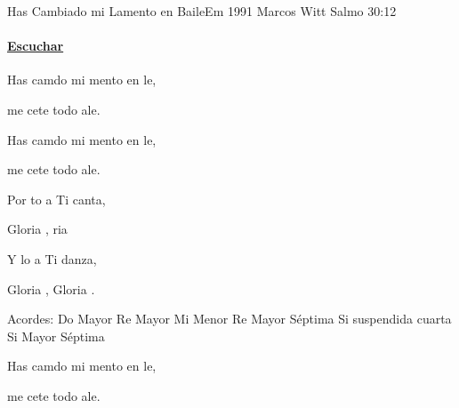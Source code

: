 \documentclass[12pt, spanish]{book}
\begin{document}
    \begin{song}{Has Cambiado mi Lamento en Baile}{Em}
    {1991} %
    {Marcos Witt}
    {Salmo 30:12} %
    {}
        \ifChordBk
            \paragraph{\mbox{}\hfill\protect\href{https://open.spotify.com/intl-es/track/31xfacYtNo5vMxk6CggXCQ}{Escuchar}\mbox{}\hfill}
        \fi

        \begin{SBOpGroup}
            Has camdo mi mento en le,

            me cete todo  ale.

            Has camdo mi mento en le,

            me cete todo  ale.
        \end{SBOpGroup}

        \begin{SBChorus}
            Por to a Ti canta,

            Gloria , ria ~

            Y lo a Ti danza,

            Gloria , Gloria .
        \end{SBChorus}

        \ifChordBk
        \begin{SBOpGroup}
            Acordes:
            \upchord{\C}\qquad Do Mayor \hfill
            \upchord{\D}\qquad Re Mayor \hfill\null\break
            \upchord{\Em}\qquad Mi Menor \hfill
            \upchord{\Dseven}\qquad Re Mayor S\'eptima \hfill\null\break
            \upchord{\Bsus}Si suspendida cuarta \hfill
            \upchord{\Bseven}Si Mayor S\'eptima \hfill\null\break
        \end{SBOpGroup}
        \fi

        \begin{SBExtraKeys}{

            \begin{SBOpGroup}
                Has camdo mi mento en le,

                me cete todo  ale.


\end{SBOpGroup}}
\end{SBExtraKeys}
\end{song}
\end{document}
